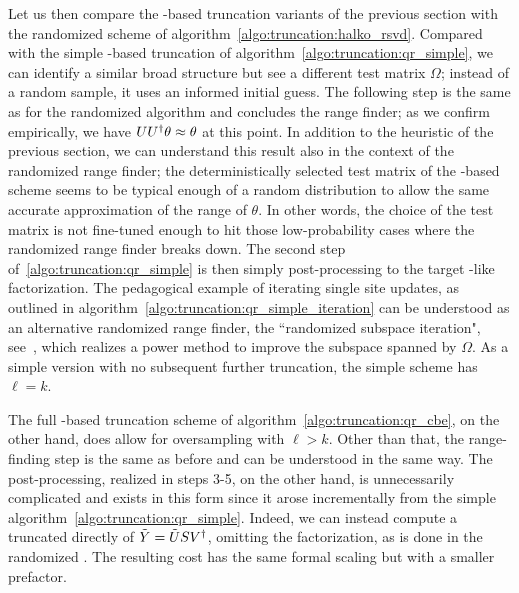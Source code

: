 Let us then compare the -based truncation variants of the previous section with the randomized scheme of algorithm~\ref{algo:truncation:halko_rsvd}.
%
Compared with the simple -based truncation of algorithm~\ref{algo:truncation:qr_simple}, we can identify a similar broad structure but see a different test matrix $\Omega$; instead of a random sample, it uses an informed initial guess.
%
The following  step is the same as for the randomized  algorithm and concludes the range finder;
as we confirm empirically, we have $UU^\dagger\theta \approx \theta$ at this point.
%
In addition to the heuristic of the previous section, we can understand this result also in the context of the randomized range finder; the deterministically selected test matrix of the -based scheme seems to be typical enough of a random distribution to allow the same accurate approximation of the range of $\theta$.
%
In other words, the choice of the test matrix is not fine-tuned enough to hit those low-probability cases where the randomized range finder breaks down.
%
The second step of~\ref{algo:truncation:qr_simple} is then simply post-processing to the target -like factorization.
%
The pedagogical example of iterating single site updates, as outlined in algorithm~\ref{algo:truncation:qr_simple_iteration} can be understood as an alternative randomized range finder, the ``randomized subspace iteration", see~\cite[alg. 4.4]{halko2010}, which realizes a power method to improve the subspace spanned by $\Omega$.
%
As a simple version with no subsequent further truncation, the simple scheme has $\ell = k$.

The full -based truncation scheme of algorithm~\ref{algo:truncation:qr_cbe}, on the other hand, does allow for oversampling with $\ell > k$.
%
Other than that, the range-finding step is the same as before and can be understood in the same way.
%
The post-processing, realized in steps 3-5, on the other hand, is unnecessarily complicated and exists in this form since it arose incrementally from the simple algorithm~\ref{algo:truncation:qr_simple}.
%
Indeed, we can instead compute a truncated  directly of $\tilde Y = \tilde{U} S V^\dagger$, omitting the  factorization, as is done in the randomized .
%
The resulting cost has the same formal scaling but with a smaller prefactor.
%
